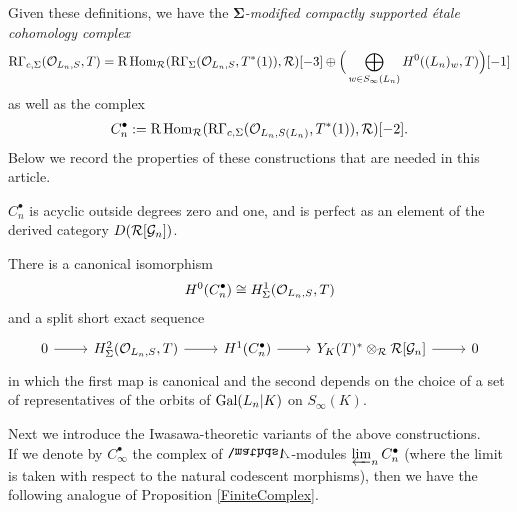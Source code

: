 \documentclass[a4paper, 
headsepline=off, DIV=12, titlepage=false]{scrartcl}
\begin{document}
Given these definitions, we have the \emph{$\bm{\Sigma}$-modified compactly supported \'etale cohomology complex} 
\[
\text{R}\Gamma_{c, \Sigma} ( \mathcal{O}_{L_n, S}, T) = 
\text{R}\operatorname{Hom}_{\mathcal{R}} ( \text{R} \Gamma_\Sigma ( \mathcal{O}_{L_n, S}, T^\ast (1)), \mathcal{R}) [-3] \oplus \Big ( \bigoplus_{w \in S_\infty (L_n)} H^0 ( (L_{n})_w, T) \Big ) [-1]
\]
as well as the complex
\begin{align*}
    C_n^\bullet := \text{R}\operatorname{Hom}_{\mathcal{R}}(\text{R}\Gamma_{c,\Sigma}(\mathcal{O}_{L_n, S(L_n)}, T^*(1)), \mathcal{R})[-2].
\end{align*}
Below we record the properties of these constructions that are needed in this article. 

\begin{prop} \label{FiniteComplex}\text{}
\begin{liste}
    \item{$C^\bullet_n$ is acyclic outside degrees zero and one, and is perfect as an element of the derived category $D(\mathcal{R} [\mathcal{G}_n])$.}
    \item{There is a canonical isomorphism
        \begin{align*}
            H^0(C^\bullet_n) \cong H^1_{\Sigma}(\mathcal{O}_{L_n, S}, T)
        \end{align*}
        and a split short exact sequence
        \begin{equation} \label{yoneda-extension-sequence-H2-finite}
        \begin{tikzcd}
           0 \arrow{r} & H^2_\Sigma ( \bigO_{L_n, S}, T) \arrow{r} & H^1 (C^\bullet_n) \arrow{r} & Y_K (T)^\ast \otimes_\cR \cR [\cG_n] \arrow{r} & 0
        \end{tikzcd}
        \end{equation}
        in which the first map is canonical and the second depends on the choice of a set of representatives of the orbits of $\text{Gal}( L_n | K)$ on $S_\infty(K)$.
    }
\end{liste}
\end{prop}

Next we introduce the Iwasawa-theoretic variants of the above constructions.\\ 

If we denote by $C^\bullet_\infty$ the complex of $\bLambda$-modules $\varprojlim_n C^\bullet_n$ (where the limit is taken with respect to the natural codescent morphisms), then we have the following analogue of Proposition \ref{FiniteComplex}.
\end{document}
